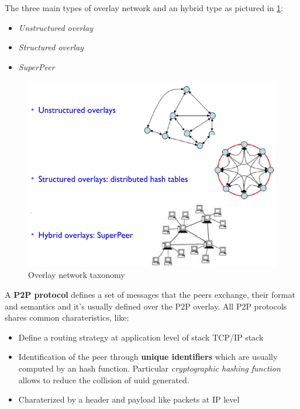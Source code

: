 \documentclass[10pt,a4paper]{report}
\begin{document}
The three main types of overlay network and an hybrid type as pictured in \ref{overlay-taxonomy}:
	\begin{itemize}
		\item \textit{Unstructured overlay}
		\item \textit{Structured overlay}
		\item \textit{SuperPeer}
	\end{itemize}
\begin{figure}
	\centering
	\includegraphics[scale=0.50]{images/Pasted image 20230224152607.png}
	\caption{Overlay network taxonomy}
	\label{overlay-taxonomy}
\end{figure}

A \textbf{P2P protocol} defines a set of messages that the peers exchange, their format and semantics and it's usually defined over the P2P overlay.
All P2P protocols shares common charateristics, like:
\begin{itemize}
	\item 
	Define a routing strategy at application level of stack TCP/IP stack
	\item 
	Identification of the peer through \textbf{unique identifiers} which are usually computed by an hash function. Particular \textit{cryptographic hashing function} allows to reduce the collision of uuid generated.
	\item 
	Charaterized by a header and payload like packets at IP level
\end{itemize}
\end{document}
